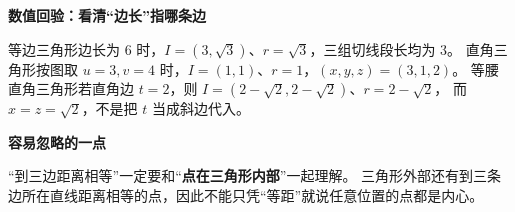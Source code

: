 \begin{explanationbox}
\medskip
\textbf{\textcolor{CExplanation}{数值回验：看清“边长”指哪条边}}

等边三角形边长为 $6$ 时，$I=(3,\sqrt3)$、$r=\sqrt3$，三组切线段长均为 $3$。
直角三角形按图取 $u=3,v=4$ 时，$I=(1,1)$、$r=1$，$(x,y,z)=(3,1,2)$。
等腰直角三角形若直角边 $t=2$，则 $I=(2-\sqrt2,2-\sqrt2)$、$r=2-\sqrt2$，
而 $x=z=\sqrt2$，不是把 $t$ 当成斜边代入。

\medskip
\textbf{\textcolor{CExplanation}{容易忽略的一点}}

“到三边距离相等”一定要和“\textbf{点在三角形内部}”一起理解。
三角形外部还有到三条边所在直线距离相等的点，因此不能只凭“等距”就说任意位置的点都是内心。
\end{explanationbox}
